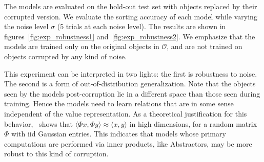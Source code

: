The models are evaluated on the hold-out test set with objects replaced by their corrupted version. We evaluate the sorting accuracy of each model while varying the noise level $\sigma$ (5 trials at each noise level). The results are shown in figures~\ref{fig:exp_robustness1} and~\ref{fig:exp_robustness2}. We emphasize that the models are trained only on the original objects in $\mathcal{O}$, and are not trained on objects corrupted by any kind of noise.

This experiment can be interpreted in two lights: the first is robustness to noise. The second is a form of out-of-distribution generalization. Note that the objects seen by the models post-corruption lie in a different space than those seen during training. Hence the models need to learn relations that are in some sense independent of the value representation. As a theoretical justification for this behavior,~\cite{zhouCompressedPrivacySensitive2009} shows that $\langle \Phi x, \Phi y \rangle \approx \langle x, y \rangle$ in high dimensions, for a random matrix $\Phi$ with iid Gaussian entries. This indicates that models whose primary computations are performed via inner products, like Abstractors, may be more robust to this kind of corruption.

